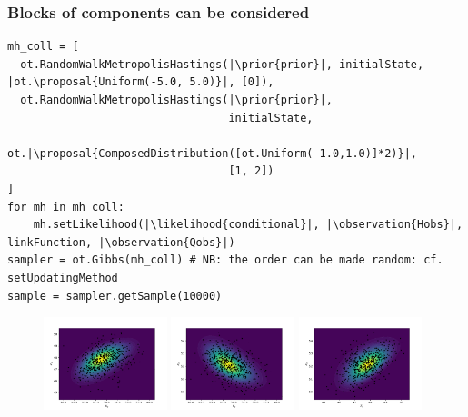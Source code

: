 \documentclass{beamer}
\newcommand{\proposal}[1]{\textcolor{blue}{#1}}
\newcommand{\prior}[1]{\textcolor{red}{#1}}
\newcommand{\likelihood}[1]{\textcolor{green}{#1}}
\newcommand{\observation}[1]{\textcolor{orange}{#1}}
\begin{document}

\begin{frame}[containsverbatim]
    \frametitle{Blocks of components can be considered}
    \medskip
    \centering
    \vspace{0.25cm}

    \begin{lstlisting}
mh_coll = [
  ot.RandomWalkMetropolisHastings(|\prior{prior}|, initialState, |ot.\proposal{Uniform(-5.0, 5.0)}|, [0]),
  ot.RandomWalkMetropolisHastings(|\prior{prior}|,
                                  initialState,
                                  ot.|\proposal{ComposedDistribution([ot.Uniform(-1.0,1.0)]*2)}|,
                                  [1, 2])
]
for mh in mh_coll:
    mh.setLikelihood(|\likelihood{conditional}|, |\observation{Hobs}|, linkFunction, |\observation{Qobs}|)
sampler = ot.Gibbs(mh_coll) # NB: the order can be made random: cf. setUpdatingMethod
sample = sampler.getSample(10000)
            \end{lstlisting}

            \begin{figure}
            \includegraphics[width=0.32\textwidth]{figures/crue_gibbs_blocs_Z_v_K_s.pdf}
            \includegraphics[width=0.32\textwidth]{figures/crue_gibbs_blocs_Z_m_K_s.pdf}
            \includegraphics[width=0.32\textwidth]{figures/crue_gibbs_blocs_Z_m_Z_v.pdf}
            \end{figure}
\end{frame}
\end{document}
